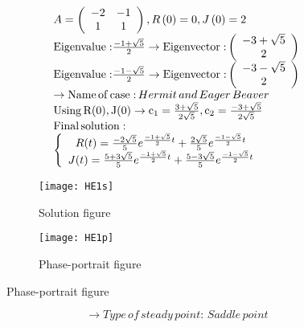 \documentclass[a4paper]{article}
\begin{document}
\[\begin{array}{l}
A = \left( {\begin{array}{*{20}{c}}
{ - 2}&{ - 1}\\
1&1
\end{array}} \right),R\left( 0 \right) = 0,J\left( 0 \right) = 2\\
{\rm{Eigenvalue:}}\frac{{ - 1 + \sqrt 5 }}{2} \to {\rm{Eigenvector:}}\left( {\begin{array}{*{20}{c}}
{ - 3 + \sqrt 5 }\\
2
\end{array}} \right)\\
{\rm{Eigenvalue:}}\frac{{ - 1 - \sqrt 5 }}{2} \to {\rm{Eigenvector:}}\left( {\begin{array}{*{20}{c}}
{ - 3 - \sqrt 5 }\\
2
\end{array}} \right)\\
 \to {\rm{Name}}\,{\rm{of}}\,{\rm{case:}}\,Hermit\,and\,Eager\,Beaver\\
{\rm{Using}}\,{\rm{R(0), J(0)}} \to {{\rm{c}}_1} = \frac{{3 + \sqrt 5 }}{{2\sqrt 5 }},{\rm{ }}{{\rm{c}}_2} = \frac{{ - 3 + \sqrt 5 }}{{2\sqrt 5 }}\\
{\rm{Final}}\,{\rm{solution:}}\\
\left\{ {\begin{array}{*{20}{c}}
{R(t) = \frac{{ - 2\sqrt 5 }}{5}{e^{\frac{{ - 1 + \sqrt 5 }}{2}t}} + \frac{{2\sqrt 5 }}{5}{e^{\frac{{ - 1 - \sqrt 5 }}{2}t}}}\\
{J(t) = \frac{{5 + 3\sqrt 5 }}{5}{e^{\frac{{ - 1 + \sqrt 5 }}{2}t}} + \frac{{5 - 3\sqrt 5 }}{5}{e^{\frac{{ - 1 - \sqrt 5 }}{2}t}}}
\end{array}} \right.
\end{array}\]
\begin{figure}[H]
\centering
\begin{subfigure}{.5\textwidth}
  \centering
  \texttt{[image: HE1s]}
  \caption*{Solution figure}
\end{subfigure}%
\begin{subfigure}{.5\textwidth}
  \centering
  \texttt{[image: HE1p]}
  \caption*{Phase-portrait figure}
\end{subfigure}
\end{figure}
\[  \to  Type\,of\,steady\,point:\,Saddle\,point\]
\end{document}

